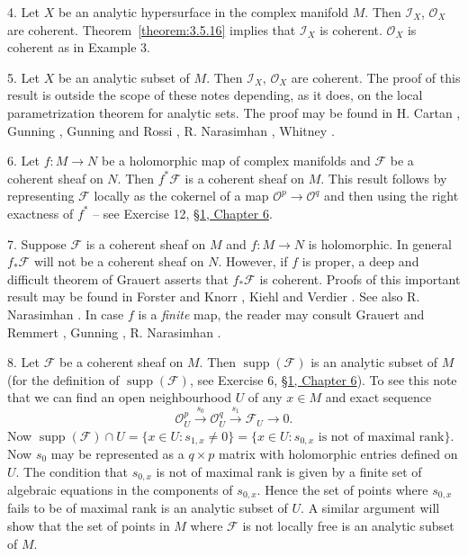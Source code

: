 4. Let $X$ be an analytic hypersurface in the complex manifold $M$. Then $\mathcal{I}_X$, $\mathcal{O}_X$ are coherent. Theorem~\ref{theorem:3.5.16} implies that $\mathcal{I}_X$ is coherent. $\mathcal{O}_X$ is coherent as in Example 3.

5. Let $X$ be an analytic subset of $M$. Then $\mathcal{I}_X$, $\mathcal{O}_X$ are coherent. The proof of this result is outside the scope of these notes depending, as it does, on the local parametrization theorem for analytic sets. The proof may be found in H. Cartan \cite{bib:II:cartan-h:1}, Gunning \cite[page 43]{bib:II:gunning-r-c:1}, Gunning and Rossi \cite{bib:II:gunning-r-c-and-rossi-h:1}, R. Narasimhan \cite{bib:II:narasimhan-r:1}, Whitney \cite{bib:II:whitney-h:1}.

6. Let $f:M\to N$ be a holomorphic map of complex manifolds and $\mathcal{F}$ be a coherent sheaf on $N$. Then $f^*\mathcal{F}$ is a coherent sheaf on $M$. This result follows by representing $\mathcal{F}$ locally as the cokernel of a map $\mathcal{O}^p\to\mathcal{O}^q$ and then using the right exactness of $f^*$ -- see Exercise 12, \hyperref[sec:6:1]{\S1, Chapter 6}.

7. Suppose $\mathcal{F}$ is a coherent sheaf on $M$ and $f:M\to N$ is holomorphic. In general $f_*\mathcal{F}$ will not be a coherent sheaf on $N$. However, if $f$ is proper, a deep and difficult theorem of Grauert asserts that $f_*\mathcal{F}$ is coherent. Proofs of this important result may be found in Forster and Knorr \cite{bib:II:forster-o-and-knorr-k:1}, Kiehl and Verdier \cite{bib:II:kiehl-r-and-verdier-j-l:1}. See also R. Narasimhan \cite{bib:II:narasimhan-r:2}. In case $f$ is a \emph{finite} map, the reader may consult Grauert and Remmert \cite{bib:II:grauert-h-and-remmert-r:1}, Gunning \cite{bib:II:gunning-r-c:1}, R. Narasimhan \cite{bib:II:narasimhan-r:1}.

8. Let $\mathcal{F}$ be a coherent sheaf on $M$. Then $\operatorname{supp}(\mathcal{F})$ is an analytic subset of $M$ (for the definition of $\operatorname{supp}(\mathcal{F})$, see Exercise 6, \hyperref[sec:6:1]{\S1, Chapter 6}). To see this note that we can find an open neighbourhood $U$ of any $x\in M$ and exact sequence
\[
\mathcal{O}_U^p\xrightarrow{s_0}\mathcal{O}_U^q\xrightarrow{s_1}\mathcal{F}_U\to0.
\]
Now $\operatorname{supp}(\mathcal{F})\cap U=\{x\in U:s_{1,x}\neq0\}=\{x\in U:s_{0,x}\text{ is not of maximal rank}\}$. Now $s_0$ may be represented as a $q\times p$ matrix with holomorphic entries defined on $U$. The condition that $s_{0,x}$ is not of maximal
rank is given by a finite set of algebraic equations in the components of $s_{0,x}$. Hence the set of points where $s_{0,x}$ fails to be of maximal rank is an analytic subset of $U$. A similar argument will show that the set of points in $M$ where $\mathcal{F}$ is not locally free is an analytic subset of $M$.


